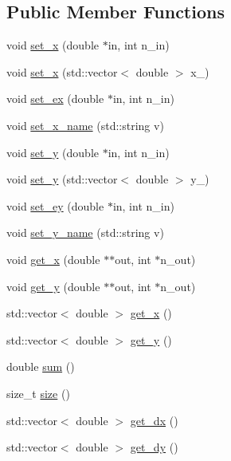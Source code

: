 \subsection*{Public Member Functions}
\begin{DoxyCompactItemize}
\item 
void \hyperlink{class_curve_a5a43592686a79c9d4e794eec1cb693ac}{set\+\_\+x} (double $\ast$in, int n\+\_\+in)
\item 
void \hyperlink{class_curve_a94659672cb6627ce6a226c9e77652e84}{set\+\_\+x} (std\+::vector$<$ double $>$ x\+\_\+)
\item 
void \hyperlink{class_curve_ab3e5da7ebd194f1c4655d4a1e1099541}{set\+\_\+ex} (double $\ast$in, int n\+\_\+in)
\item 
void \hyperlink{class_curve_a8170b7da97887fa363250bf34bb53859}{set\+\_\+x\+\_\+name} (std\+::string v)
\item 
void \hyperlink{class_curve_a16534fa18b0982751ebf2c19eb092949}{set\+\_\+y} (double $\ast$in, int n\+\_\+in)
\item 
void \hyperlink{class_curve_a4c87680fa04d360bc5094112fe9c91b1}{set\+\_\+y} (std\+::vector$<$ double $>$ y\+\_\+)
\item 
void \hyperlink{class_curve_a11bda872bbbac4856b941eb645ecdd22}{set\+\_\+ey} (double $\ast$in, int n\+\_\+in)
\item 
void \hyperlink{class_curve_a562c865538b8f3ea74cd195d5644bb4f}{set\+\_\+y\+\_\+name} (std\+::string v)
\item 
void \hyperlink{class_curve_aa4c5bd9700d1db6073179b2d1b61775b}{get\+\_\+x} (double $\ast$$\ast$out, int $\ast$n\+\_\+out)
\item 
void \hyperlink{class_curve_ab7fbad5767e33a69754db0e0a1f42bae}{get\+\_\+y} (double $\ast$$\ast$out, int $\ast$n\+\_\+out)
\item 
std\+::vector$<$ double $>$ \hyperlink{class_curve_a69eed37c328a574ba58cd9fa5f15dd9d}{get\+\_\+x} ()
\item 
std\+::vector$<$ double $>$ \hyperlink{class_curve_a1cd5680f5bbfdfb575860b6cc73700ab}{get\+\_\+y} ()
\item 
double \hyperlink{class_curve_a6d554f1ab79e7b741eea5abded25874b}{sum} ()
\item 
size\+\_\+t \hyperlink{class_curve_add93ea6b8418185dcc647273fd85bcef}{size} ()
\item 
std\+::vector$<$ double $>$ \hyperlink{class_curve_a1e74c35667105b4ce24c913b4963000a}{get\+\_\+dx} ()
\item 
std\+::vector$<$ double $>$ \hyperlink{class_curve_aaa80e048e9d96c5c82a7e83d05269140}{get\+\_\+dy} ()

\end{DoxyCompactItemize}
